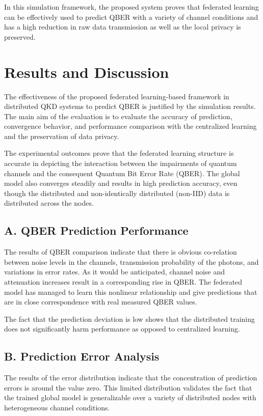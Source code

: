 \documentclass[conference]{IEEEtran}
\begin{document}
In this simulation framework, the proposed system proves that federated learning can be effectively used to predict QBER with a variety of channel conditions and has a high reduction in raw data transmission as well as the local privacy is preserved. 


\section{Results and Discussion}

The effectiveness of the proposed federated learning-based framework in distributed QKD systems to predict QBER is justified by the simulation results. The main aim of the evaluation is to evaluate the accuracy of prediction, convergence behavior, and performance comparison with the centralized learning and the preservation of data privacy. 

The experimental outcomes prove that the federated learning structure is accurate in depicting the interaction between the impairments of quantum channels and the consequent Quantum Bit Error Rate (QBER). The global model also converges steadily and results in high prediction accuracy, even though the distributed and non-identically distributed (non-IID) data is distributed across the nodes. 

 

\subsection*{A. QBER Prediction Performance}

The results of QBER comparison indicate that there is obvious co-relation between noise levels in the channels, transmission probability of the photons, and variations in error rates. As it would be anticipated, channel noise and attenuation increases result in a corresponding rise in QBER. The federated model has managed to learn this nonlinear relationship and give predictions that are in close correspondence with real measured QBER values. 

The fact that the prediction deviation is low shows that the distributed training does not significantly harm performance as opposed to centralized learning. 

 
\subsection*{B. Prediction Error Analysis}

The results of the error distribution indicate that the concentration of prediction errors is around the value zero. This limited distribution validates the fact that the trained global model is generalizable over a variety of distributed nodes with heterogeneous channel conditions. 
\end{document}
